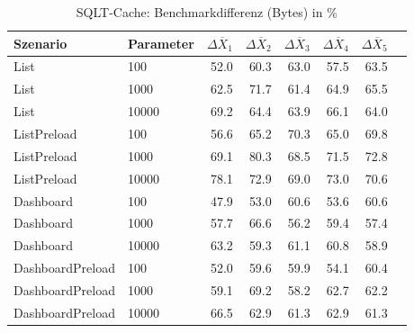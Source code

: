 
\begin{table}[ht]
\setlength{\extrarowheight}{-1pt}
\centering
\caption{SQLT-Cache: Benchmarkdifferenz (Bytes) in \%}
\begin{tabular}{llrrrrrr}
\toprule
Szenario & Parameter & ${\Delta \overline{X}_1}$ & ${\Delta \overline{X}_2}$ & ${\Delta \overline{X}_3}$ & ${\Delta \overline{X}_4}$ & ${\Delta \overline{X}_5}$ \\
\midrule
	List & 100 & \cellcolor{green!29}  52.0 & \cellcolor{green!26}  60.3 & \cellcolor{green!25}  63.0 & \cellcolor{green!27}  57.5 & \cellcolor{green!25}  63.5 \\
	List & 1000 & \cellcolor{green!25}  62.5 & \cellcolor{green!21}  71.7 & \cellcolor{green!25}  61.4 & \cellcolor{green!24}  64.9 & \cellcolor{green!24}  65.5 \\
	List & 10000 & \cellcolor{green!22}  69.2 & \cellcolor{green!24}  64.4 & \cellcolor{green!24}  63.9 & \cellcolor{green!24}  66.1 & \cellcolor{green!24}  64.0 \\
	ListPreload & 100 & \cellcolor{green!27}  56.6 & \cellcolor{green!24}  65.2 & \cellcolor{green!22}  70.3 & \cellcolor{green!24}  65.0 & \cellcolor{green!22}  69.8 \\
	ListPreload & 1000 & \cellcolor{green!22}  69.1 & \cellcolor{green!18}  80.3 & \cellcolor{green!23}  68.5 & \cellcolor{green!21}  71.5 & \cellcolor{green!21}  72.8 \\
	ListPreload & 10000 & \cellcolor{green!19}  78.1 & \cellcolor{green!21}  72.9 & \cellcolor{green!22}  69.0 & \cellcolor{green!21}  73.0 & \cellcolor{green!22}  70.6 \\
	Dashboard & 100 & \cellcolor{green!30}  47.9 & \cellcolor{green!29}  53.0 & \cellcolor{green!26}  60.6 & \cellcolor{green!29}  53.6 & \cellcolor{green!26}  60.6 \\
	Dashboard & 1000 & \cellcolor{green!27}  57.7 & \cellcolor{green!23}  66.6 & \cellcolor{green!28}  56.2 & \cellcolor{green!26}  59.4 & \cellcolor{green!27}  57.4 \\
	Dashboard & 10000 & \cellcolor{green!25}  63.2 & \cellcolor{green!26}  59.3 & \cellcolor{green!26}  61.1 & \cellcolor{green!26}  60.8 & \cellcolor{green!26}  58.9 \\
	DashboardPreload & 100 & \cellcolor{green!29}  52.0 & \cellcolor{green!26}  59.6 & \cellcolor{green!26}  59.9 & \cellcolor{green!28}  54.1 & \cellcolor{green!26}  60.4 \\
	DashboardPreload & 1000 & \cellcolor{green!26}  59.1 & \cellcolor{green!22}  69.2 & \cellcolor{green!27}  58.2 & \cellcolor{green!25}  62.7 & \cellcolor{green!25}  62.2 \\
	DashboardPreload & 10000 & \cellcolor{green!23}  66.5 & \cellcolor{green!25}  62.9 & \cellcolor{green!25}  61.3 & \cellcolor{green!25}  62.9 & \cellcolor{green!25}  61.3 \\
\bottomrule
\end{tabular}
\label{tab:benchmarkdifferenz_sqlt-cache_bytes}
\end{table}
	